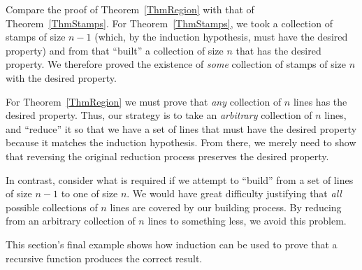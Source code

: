 Compare the proof of Theorem~\ref{ThmRegion} with that of
Theorem~\ref{ThmStamps}.
For Theorem~\ref{ThmStamps}, we took a collection of stamps of size
\(n-1\) (which, by the induction hypothesis, must have the desired
property) and from that ``built'' a collection of size \(n\) that has
the desired property.
We therefore proved the existence of \emph{some} collection of stamps
of size \(n\) with the desired property.

For Theorem~\ref{ThmRegion} we must prove that \emph{any}
collection of \(n\) lines has the desired property.
Thus, our strategy is to take an \emph{arbitrary} collection of \(n\)
lines, and ``reduce'' it so that we have a set of lines that must have 
the desired property because it matches the induction hypothesis.
From there, we merely need to show that reversing the original
reduction process preserves the desired property.

In contrast, consider what is required if we attempt to
``build'' from a set of lines of size \(n-1\) to one of size \(n\).
We would have great difficulty justifying that \emph{all} possible
collections of \(n\) lines are covered by our building process.
By reducing from an arbitrary collection of \(n\) lines to something
less, we avoid this problem.

This section's final example shows how induction can be used to
prove that a recursive function produces the correct result.

